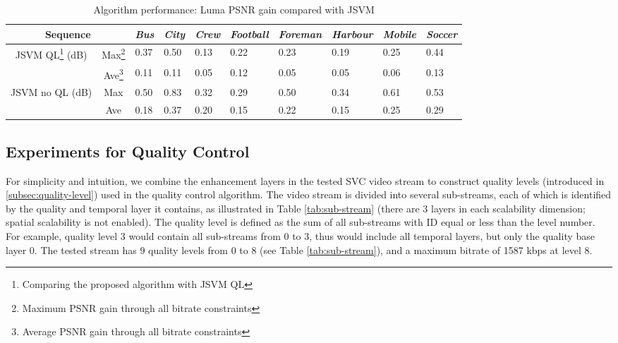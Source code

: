 \documentclass[journal]{IEEEtran}
\begin{document}
\begin{table}[t]
\centering
\caption{Algorithm performance: Luma PSNR gain compared with JSVM}
\label{tab:results}
\begin{minipage}{0.95\linewidth}
\centering
\begin{tabular}{c|c|p{1.2cm}<{\centering}|p{1.2cm}<{\centering}|p{1.2cm}<{\centering}|p{1.2cm}<{\centering}| 
p{1.2cm}<{\centering}|p{1.2cm}<{\centering}|p{1.2cm}<{\centering}|p{1.2cm}<{\centering}}
\hline \hline
\multicolumn{2}{c|}{Sequence} &
{\em Bus} & {\em City} & {\em Crew} & {\em Football} & {\em Foreman} & {\em Harbour} & {\em Mobile} & {\em Soccer} \\ \hline 
\multirow{2}{*}{JSVM QL\footnote{\label{footnote:JSVM_QL} Comparing the proposed algorithm with JSVM QL} (dB)}
& Max\footnote{\label{footnote:max} Maximum PSNR gain through all bitrate constraints} & 0.37 & 0.50 & 0.13 & 0.22 & 0.23 & 0.19 & 0.25 & 0.44 \\ \cline{2-10}
& Ave\footnote{\label{footnote:ave} Average PSNR gain through all bitrate constraints} & 0.11 & 0.11 & 0.05 & 0.12 & 0.05 & 0.05 & 0.06 & 0.13 \\ \hline
\multirow{2}{*}{JSVM no QL (dB)}
& Max & 0.50 & 0.83 & 0.32 & 0.29 & 0.50 & 0.34 & 0.61 & 0.53 \\ \cline{2-10}
& Ave & 0.18 & 0.37 & 0.20 & 0.15 & 0.22 & 0.15 & 0.25 & 0.29 \\ \hline
\end{tabular}
\end{minipage}
\end{table}

\subsection{Experiments for Quality Control}
\label{subsec:exp-control}

For simplicity and intuition, we combine the enhancement layers in the tested SVC video stream to construct quality levels (introduced in \ref{subsec:quality-level}) used in the quality control algorithm. The video stream is divided into several sub-streams, each of which is identified by the quality and temporal layer it contains, as illustrated in Table \ref{tab:sub-stream} (there are 3 layers in each scalability dimension; spatial scalability is not enabled). The quality level is defined as the sum of all sub-streams with ID equal or less than the level number. For example, quality level 3 would contain all sub-streams from 0 to 3, thus would include all temporal layers, but only the quality base layer 0. The tested stream has 9 quality levels from 0 to 8 (see Table \ref{tab:sub-stream}), and a maximum bitrate of 1587 kbps at level 8. 
\end{document}
